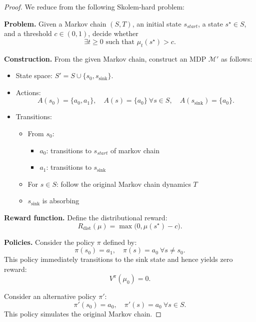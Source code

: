 \documentclass{article}
\begin{document}
\begin{proof}
We reduce from the following Skolem-hard problem:

\medskip
\noindent
\textbf{Problem.} Given a Markov chain $(S,T)$, an initial state $s_{start}$, a state $s^\star \in S$, and a threshold $c \in (0,1)$, decide whether
\[
\exists t \ge 0 \text{ such that } \mu_t(s^\star) > c.
\]

\medskip

\textbf{Construction.}
From the given Markov chain, construct an MDP $\mathcal{M}'$ as follows:

\begin{itemize}
    \item State space: $S' = S \cup \{s_0, s_{\mathrm{sink}}\}$.
    
    \item Actions:
    \[
    A(s_0) = \{a_0, a_1\}, \quad
    A(s) = \{a_0\} \ \forall s \in S, \quad
    A(s_{\mathrm{sink}}) = \{a_0\}.
    \]
    
    \item Transitions:
    \begin{itemize}
        \item From $s_0$:
        \begin{itemize}
            \item $a_0$: transitions to  $s_{start}$ of markov chain 
            \item $a_1$: transitions to $s_{\mathrm{sink}}$
        \end{itemize}
        \item For $s \in S$: follow the original Markov chain dynamics $T$
        \item $s_{\mathrm{sink}}$ is absorbing
    \end{itemize}
\end{itemize}

\medskip

\textbf{Reward function.}
Define the distributional reward:
\[
R_{\mathrm{dist}}(\mu) = \max\big(0, \mu(s^\star) - c \big).
\]

\medskip

\textbf{Policies.}
Consider the policy $\pi$ defined by:
\[
\pi(s_0) = a_1, \quad \pi(s) = a_0 \ \forall s \neq s_0.
\]
This policy immediately transitions to the sink state and hence yields zero reward:
\[
V^\pi(\mu_0) = 0.
\]

Consider an alternative policy $\pi'$:
\[
\pi'(s_0) = a_0, \quad \pi'(s) = a_0 \ \forall s \in S.
\]
This policy simulates the original Markov chain.


\end{proof}
\end{document}
